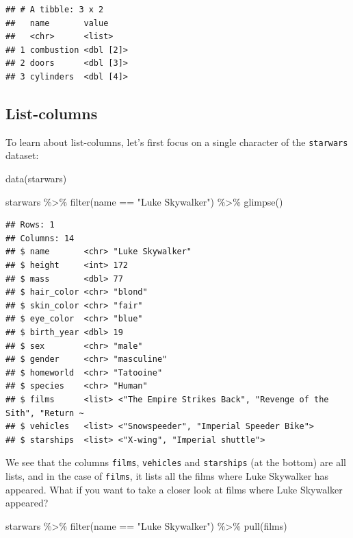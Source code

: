 \documentclass[
]{article}
\newenvironment{Shaded}{\begin{snugshade}}{\end{snugshade}}
\newcommand{\FunctionTok}[1]{\textcolor[rgb]{0.00,0.00,0.00}{#1}}
\newcommand{\NormalTok}[1]{#1}
\newcommand{\SpecialCharTok}[1]{\textcolor[rgb]{0.00,0.00,0.00}{#1}}
\newcommand{\StringTok}[1]{\textcolor[rgb]{0.31,0.60,0.02}{#1}}
\begin{document}
\begin{verbatim}
## # A tibble: 3 x 2
##   name       value    
##   <chr>      <list>   
## 1 combustion <dbl [2]>
## 2 doors      <dbl [3]>
## 3 cylinders  <dbl [4]>
\end{verbatim}

\hypertarget{list-columns}{%
\subsection{List-columns}\label{list-columns}}

To learn about list-columns, let's first focus on a single character of the \texttt{starwars} dataset:

\begin{Shaded}
\begin{Highlighting}[]
\FunctionTok{data}\NormalTok{(starwars)}
\end{Highlighting}
\end{Shaded}

\begin{Shaded}
\begin{Highlighting}[]
\NormalTok{starwars }\SpecialCharTok{\%\textgreater{}\%}
  \FunctionTok{filter}\NormalTok{(name }\SpecialCharTok{==} \StringTok{"Luke Skywalker"}\NormalTok{) }\SpecialCharTok{\%\textgreater{}\%}
  \FunctionTok{glimpse}\NormalTok{()}
\end{Highlighting}
\end{Shaded}

\begin{verbatim}
## Rows: 1
## Columns: 14
## $ name       <chr> "Luke Skywalker"
## $ height     <int> 172
## $ mass       <dbl> 77
## $ hair_color <chr> "blond"
## $ skin_color <chr> "fair"
## $ eye_color  <chr> "blue"
## $ birth_year <dbl> 19
## $ sex        <chr> "male"
## $ gender     <chr> "masculine"
## $ homeworld  <chr> "Tatooine"
## $ species    <chr> "Human"
## $ films      <list> <"The Empire Strikes Back", "Revenge of the Sith", "Return ~
## $ vehicles   <list> <"Snowspeeder", "Imperial Speeder Bike">
## $ starships  <list> <"X-wing", "Imperial shuttle">
\end{verbatim}

We see that the columns \texttt{films}, \texttt{vehicles} and \texttt{starships} (at the bottom) are all lists, and in
the case of \texttt{films}, it lists all the films where Luke Skywalker has appeared. What if you want to
take a closer look at films where Luke Skywalker appeared?

\begin{Shaded}
\begin{Highlighting}[]
\NormalTok{starwars }\SpecialCharTok{\%\textgreater{}\%}
  \FunctionTok{filter}\NormalTok{(name }\SpecialCharTok{==} \StringTok{"Luke Skywalker"}\NormalTok{) }\SpecialCharTok{\%\textgreater{}\%}
  \FunctionTok{pull}\NormalTok{(films)}
\end{Highlighting}
\end{Shaded}
\end{document}
